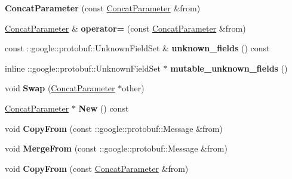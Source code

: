 \begin{DoxyCompactItemize}
{\bfseries Concat\+Parameter} (const \mbox{\hyperlink{classcaffe_1_1_concat_parameter}{Concat\+Parameter}} \&from)
\item 
\mbox{\label{classcaffe_1_1_concat_parameter_a69b81243837437540198bcffd3ace169}} 
\mbox{\hyperlink{classcaffe_1_1_concat_parameter}{Concat\+Parameter}} \& {\bfseries operator=} (const \mbox{\hyperlink{classcaffe_1_1_concat_parameter}{Concat\+Parameter}} \&from)
\item 
\mbox{\label{classcaffe_1_1_concat_parameter_aba8ee3d2129a16a82c8833ac71f4e038}} 
const \+::google\+::protobuf\+::\+Unknown\+Field\+Set \& {\bfseries unknown\+\_\+fields} () const
\item 
\mbox{\label{classcaffe_1_1_concat_parameter_a09912d7d23c103364295f354b4a37f38}} 
inline \+::google\+::protobuf\+::\+Unknown\+Field\+Set $\ast$ {\bfseries mutable\+\_\+unknown\+\_\+fields} ()
\item 
\mbox{\label{classcaffe_1_1_concat_parameter_a75a785aba6876954d3e96be2eb2d031f}} 
void {\bfseries Swap} (\mbox{\hyperlink{classcaffe_1_1_concat_parameter}{Concat\+Parameter}} $\ast$other)
\item 
\mbox{\label{classcaffe_1_1_concat_parameter_a20162f2c5b39c60bf01d40563d69f728}} 
\mbox{\hyperlink{classcaffe_1_1_concat_parameter}{Concat\+Parameter}} $\ast$ {\bfseries New} () const
\item 
\mbox{\label{classcaffe_1_1_concat_parameter_ae16099cc82ab0e874e85e0a45429d70c}} 
void {\bfseries Copy\+From} (const \+::google\+::protobuf\+::\+Message \&from)
\item 
\mbox{\label{classcaffe_1_1_concat_parameter_a82a2c3c2d9e59c9b6b0b7c5907f7c1ab}} 
void {\bfseries Merge\+From} (const \+::google\+::protobuf\+::\+Message \&from)
\item 
\mbox{\label{classcaffe_1_1_concat_parameter_adfb0739cb75acc3dd2ce4feac184eb67}} 
void {\bfseries Copy\+From} (const \mbox{\hyperlink{classcaffe_1_1_concat_parameter}{Concat\+Parameter}} \&from)

\end{DoxyCompactItemize}
